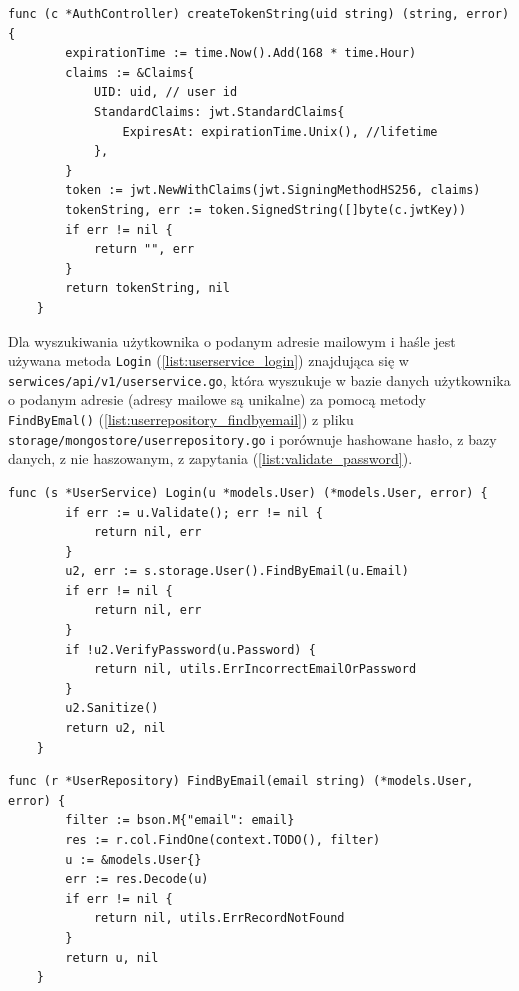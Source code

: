 \begin{lstlisting}[label=list:get_jwt_token,caption=Generacja JWT tokena,basicstyle=\tiny\ttfamily]
    func (c *AuthController) createTokenString(uid string) (string, error) {
        expirationTime := time.Now().Add(168 * time.Hour)
        claims := &Claims{
            UID: uid, // user id
            StandardClaims: jwt.StandardClaims{
                ExpiresAt: expirationTime.Unix(), //lifetime
            },
        }
        token := jwt.NewWithClaims(jwt.SigningMethodHS256, claims)
        tokenString, err := token.SignedString([]byte(c.jwtKey))
        if err != nil {
            return "", err
        }
        return tokenString, nil
    }
\end{lstlisting}

Dla wyszukiwania użytkownika o podanym adresie mailowym i haśle jest używana metoda \texttt{Login} (\ref{list:userservice_login}) znajdująca się w \texttt{serwices/api/v1/userservice.go},
która wyszukuje w bazie danych użytkownika o podanym adresie (adresy mailowe są unikalne) za pomocą metody \texttt{FindByEmal()} (\ref{list:userrepository_findbyemail}) z pliku \texttt{storage/mongostore/userrepository.go} i porównuje hashowane hasło, z bazy danych, z nie haszowanym, z zapytania (\ref{list:validate_password}).
\begin{lstlisting}[label=list:userservice_login,caption=Serwis logowania uzytkownika,basicstyle=\tiny\ttfamily]
    func (s *UserService) Login(u *models.User) (*models.User, error) {
        if err := u.Validate(); err != nil {
            return nil, err
        }
        u2, err := s.storage.User().FindByEmail(u.Email)
        if err != nil {
            return nil, err
        }
        if !u2.VerifyPassword(u.Password) {
            return nil, utils.ErrIncorrectEmailOrPassword
        }
        u2.Sanitize()
        return u2, nil
    }
\end{lstlisting}

\begin{lstlisting}[label=list:userrepository_findbyemail,caption=Wysukiwanie użytkownika w bazie po adresie mailowym,basicstyle=\tiny\ttfamily]
    func (r *UserRepository) FindByEmail(email string) (*models.User, error) {
        filter := bson.M{"email": email}
        res := r.col.FindOne(context.TODO(), filter)
        u := &models.User{}
        err := res.Decode(u)
        if err != nil {
            return nil, utils.ErrRecordNotFound
        }
        return u, nil
    }
\end{lstlisting}


